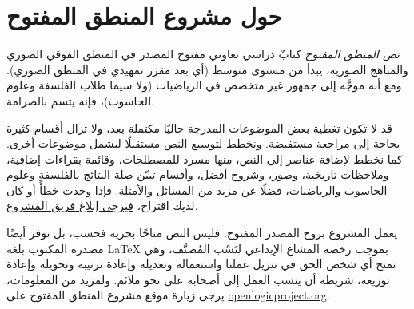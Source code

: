 \chapter*{حول مشروع المنطق المفتوح}


\textit{نص المنطق المفتوح} كتابٌ دراسي تعاوني مفتوح المصدر في المنطق
الفوقي الصوري والمناهج الصورية، يبدأ من مستوى متوسط (أي بعد مقرر
تمهيدي في المنطق الصوري). ومع أنه موجَّه إلى جمهور غير متخصص في
الرياضيات (ولا سيما طلاب الفلسفة وعلوم الحاسوب)، فإنه يتسم بالصرامة.

قد لا تكون تغطية بعض الموضوعات المدرجة حاليًا مكتملة بعد، ولا تزال
أقسام كثيرة بحاجة إلى مراجعة مستفيضة. ونخطط لتوسيع النص مستقبلًا ليشمل
موضوعات أخرى. كما نخطط لإضافة عناصر إلى النص، منها مسرد للمصطلحات،
وقائمة بقراءات إضافية، وملاحظات تاريخية، وصور، وشروح أفضل، وأقسام
تبيّن صلة النتائج بالفلسفة وعلوم الحاسوب والرياضيات، فضلًا عن مزيد من
المسائل والأمثلة. فإذا وجدت خطأً أو كان لديك اقتراح،
\href{https://github.com/OpenLogicProject/OpenLogic/wiki/Contributing}{فيرجى إبلاغ فريق المشروع}.

يعمل المشروع بروح المصدر المفتوح. فليس النص متاحًا بحرية فحسب، بل
نوفر أيضًا مصدره المكتوب بلغة LaTeX بموجب رخصة المشاع الإبداعي لنَسْب
المُصنَّف، وهي تمنح أي شخص الحق في تنزيل عملنا واستعماله وتعديله وإعادة
ترتيبه وتحويله وإعادة توزيعه، شريطة أن ينسب العمل إلى أصحابه على نحو ملائم.
ولمزيد من المعلومات، يرجى زيارة موقع مشروع المنطق المفتوح على
\href{http://openlogicproject.org/}{openlogicproject.org}.
